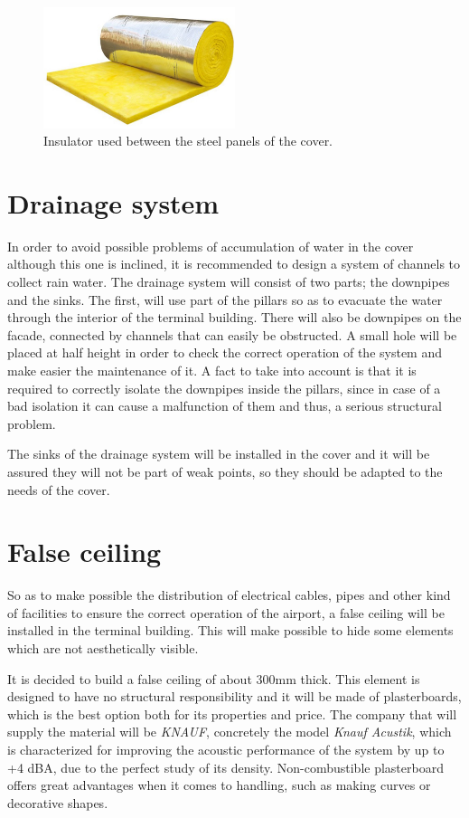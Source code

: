 \begin{figure}[H]
	\centering
	\includegraphics[clip, trim=0cm 0cm 0cm 0cm, width=0.5\textwidth]{./images/cover/glasswool}
	\caption{Insulator used between the steel panels of the cover.}
	\label{glasswool}
\end{figure}
		
	\section{Drainage system}
In order to avoid possible problems of accumulation of water in the cover although this one is inclined, it is recommended to design a system of channels to collect rain water. The drainage system will consist of two parts; the downpipes and the sinks. The first, will use part of the pillars so as to evacuate the water through the interior of the terminal building. There will also be downpipes on the facade, connected by channels that can easily be obstructed. A small hole will be placed at half height in order to check the correct operation of the system and make easier the maintenance of it. A fact to take into account is that it is required to correctly isolate the downpipes inside the pillars, since in case of a bad isolation it can cause a malfunction of them and thus, a serious structural problem.

The sinks of the drainage system will be installed in the cover and it will be assured they will not be part of weak points, so they should be adapted to the needs of the cover.

	\section{False ceiling}
So as to make possible the distribution of electrical cables, pipes and other kind of facilities to ensure the correct operation of the airport, a false ceiling will be installed in the terminal building. This will make possible to hide some elements which are not aesthetically visible.

It is decided to build a false ceiling of about 300mm thick. This element is designed to have no structural responsibility and it will be made of plasterboards, which is the best option both for its properties and price. The company that will supply the material will be \textit{KNAUF}, concretely the model \textit{Knauf Acustik}, which is characterized for improving the acoustic performance of the system by up to +4 dBA, due to the perfect study of its density. Non-combustible plasterboard offers great advantages when it comes to handling, such as making curves or decorative shapes.

